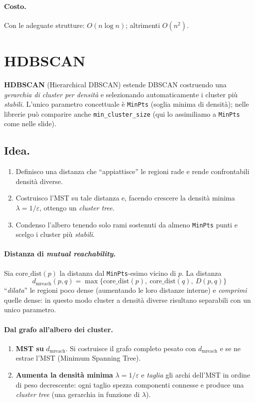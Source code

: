 \paragraph{Costo.}
Con le adeguate strutture: $O(n\log n)$; altrimenti $O(n^2)$.

\section{HDBSCAN}\label{sec:hdbscan}
\textbf{HDBSCAN} (Hierarchical DBSCAN) estende DBSCAN costruendo una \emph{gerarchia di cluster per densità} e selezionando
automaticamente i cluster più \emph{stabili}. L’unico parametro concettuale è \texttt{MinPts} (soglia minima di densità); nelle librerie può comparire anche \texttt{min\_cluster\_size} (qui lo assimiliamo a \texttt{MinPts} come nelle slide).

\subsection*{Idea.}
\begin{enumerate}
  \item Definisco una distanza che “appiattisce” le regioni rade e rende confrontabili densità diverse.
  \item Costruisco l’MST su tale distanza e, facendo crescere la densità minima \(\lambda=1/\varepsilon\), ottengo un \emph{cluster tree}.
  \item Condenso l’albero tenendo solo rami sostenuti da almeno \texttt{MinPts} punti e scelgo i cluster più \emph{stabili}. 
\end{enumerate}

\paragraph{Distanza di \emph{mutual reachability}.}
Sia \(\mathrm{core\_dist}(p)\) la distanza dal \texttt{MinPts}-esimo vicino di \(p\). La distanza
\[
d_{\text{mreach}}(p,q)=\max\big\{\mathrm{core\_dist}(p),\ \mathrm{core\_dist}(q),\ D(p,q)\big\}
\]
“\emph{dilata}” le regioni poco dense (aumentando le loro distanze interne) e \emph{comprimi} quelle dense: in questo modo cluster a densità diverse risultano separabili con un unico parametro.

\paragraph{Dal grafo all’albero dei cluster.}
\begin{enumerate}
  \item \textbf{MST su} \(d_{\text{mreach}}\). Si costruisce il grafo completo pesato con \(d_{\text{mreach}}\) e se ne estrae l’MST (Minimum Spanning Tree).
  \item \textbf{Aumenta la densità minima} \(\lambda=1/\varepsilon\) e \emph{taglia} gli archi dell’MST in ordine di peso decrescente: ogni taglio spezza componenti connesse e produce una \emph{cluster tree} (una gerarchia in funzione di \(\lambda\)).
\end{enumerate}

